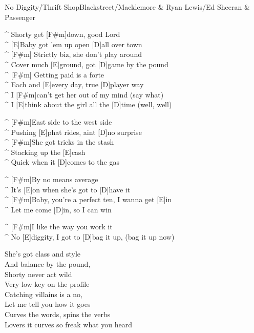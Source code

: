 \begin{song}{No Diggity/Thrift Shop}{Blackstreet/Macklemore \& Ryan Lewis/Ed Sheeran \& Passenger}

\begin{guitar}
^ Shorty get [F#m]down, good Lord\\
^ [E]Baby got 'em up open [D]all over town\\
^ [F#m]   Strictly biz, she don't play around\\
^ Cover much [E]ground, got [D]game by the pound\\
^ [F#m]   Getting paid is a forte\\
^ Each and [E]every day, true [D]player way\\
^ I [F#m]can't get her out of my mind (say what)\\
^ I [E]think about the girl all the [D]time (well, well)\\
\end{guitar}

\begin{guitar}
^ [F#m]East side to the west side\\
^ Pushing [E]phat rides, aint [D]no surprise\\
^ [F#m]She got tricks in the stash\\
^ Stacking up the [E]cash\\
^ Quick when it [D]comes to the gas\\
\end{guitar}

\begin{guitar}
^ [F#m]By no means average\\
^ It's [E]on when she's got to [D]have it\\
^ [F#m]Baby, you're a perfect ten, I wanna get [E]in\\
^ Let me come [D]in, so I can win\\
\end{guitar}


\begin{guitar}
^ [F#m]I like the way you work it \\
^ No [E]diggity, I got to [D]bag it up, (bag it up now)\\
\end{guitar}

\begin{guitar}
She's got class and style\\
And balance by the pound,\\
Shorty never act wild\\
Very low key on the profile\\
Catching villains is a no,\\
Let me tell you how it goes\\
Curves the words, spins the verbs\\
Lovers it curves so freak what you heard\\
\end{guitar}


\end{song}
